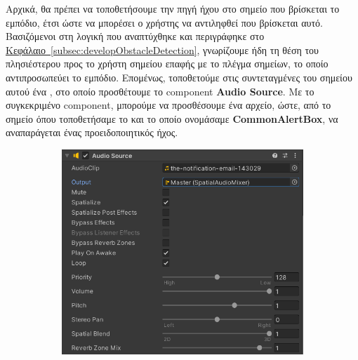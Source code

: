 Αρχικά, θα πρέπει να τοποθετήσουμε την πηγή ήχου στο σημείο που βρίσκεται το εμπόδιο, έτσι ώστε να μπορέσει ο χρήστης να αντιληφθεί που βρίσκεται αυτό. Βασιζόμενοι στη λογική που αναπτύχθηκε και περιγράφηκε στο \hyperref[subsec:developObstacleDetection]{Κεφάλαιο~\ref*{subsec:developObstacleDetection}}, γνωρίζουμε ήδη τη θέση του πλησιέστερου προς το χρήστη σημείου επαφής με το πλέγμα σημείων, το οποίο αντιπροσωπεύει το εμπόδιο. Επομένως, τοποθετούμε στις συντεταγμένες του σημείου αυτού ένα , στο οποίο προσθέτουμε το component \textbf{Audio Source}. Με το συγκεκριμένο component, μπορούμε να προσθέσουμε ένα αρχείο, ώστε, από το σημείο όπου τοποθετήσαμε το  και το οποίο ονομάσαμε \textbf{CommonAlertBox}, να αναπαράγεται ένας προειδοποιητικός ήχος.

\begin{figure}[!h]
    \centering
    \begin{subfigure}{0.5\textwidth}
        \centering
        \includegraphics[width=1\linewidth]{images/develop_AudioSourceOne.png}
        \caption{}
    \end{subfigure}%
    \begin{subfigure}{0.5\textwidth}
        \centering

\end{subfigure}
\end{figure}
